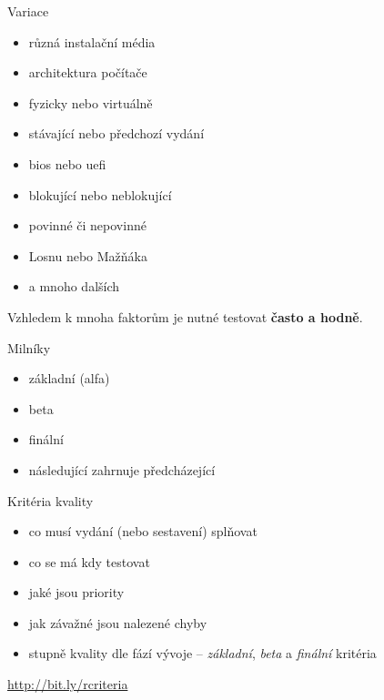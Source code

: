 \documentclass[12pt,aspectratio=169]{beamer}
\begin{document}
\begin{frame}{Variace}
	
	\begin{itemize}
		\item různá instalační média
		\item architektura počítače
		\item fyzicky nebo virtuálně
		\item stávající nebo předchozí vydání
		\item bios nebo uefi
		\item blokující nebo neblokující
		\item povinné či nepovinné
		\item Losnu nebo Mažňáka
		\item a mnoho dalších
	\end{itemize}

\vspace{10pt}

Vzhledem k mnoha faktorům je nutné testovat \textbf{často a hodně}. 
\end{frame}

\begin{frame}{Milníky}
	\begin{itemize}
	\item základní (alfa)
	\item beta
	\item finální
	\item následující zahrnuje předcházející
\end{itemize}
\end{frame}

\begin{frame}{Kritéria kvality}
	
	\begin{itemize}
		\item co musí vydání (nebo sestavení) splňovat
		\item co se má kdy testovat
		\item jaké jsou priority
		\item jak závažné jsou nalezené chyby
		\item stupně kvality dle fází vývoje -- \textit{základní}, \textit{beta} a \textit{finální} kritéria
	\end{itemize}
	
	\vspace{10pt}
	
	{\small \url{http://bit.ly/rcriteria}}
\end{frame}
\end{document}
